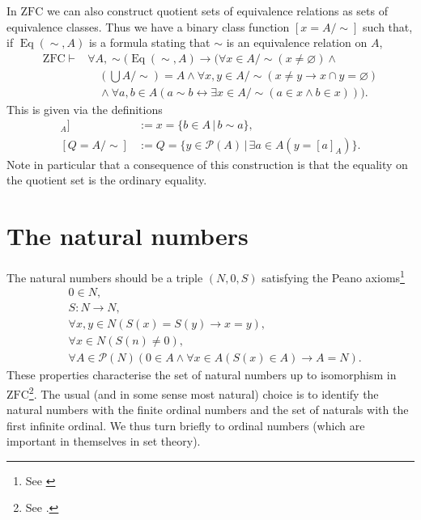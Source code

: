 \documentclass{scrartcl}
\theoremstyle{definition}
\theoremstyle{plain}
\theoremstyle{remark}
\newcommand{\ZFC}{\ensuremath{\mathrm{ZFC}}}
\newcommand{\limp}{\rightarrow}
\newcommand{\liff}{\leftrightarrow}
\newcommand{\Pow}{\mathcal{P}}
\newcommand{\sep}{\,|\,}
\newcommand{\eqdef}{:=}
\newcommand{\quot}[2]{#1/\!\!#2}
\DeclareMathOperator{\Eq}{Eq}
\begin{document}
In $\ZFC$ we can also construct quotient sets of equivalence relations as sets of equivalence classes. Thus we have a binary class function $[x = \quot{A}{\sim}]$ such that, if $\Eq(\sim,A)$ is a formula stating that $\sim$ is an equivalence relation on $A$,
\begin{align*}
  \ZFC \vdash &\forall A, \sim (\Eq(\sim,A) \limp (\forall x \in \quot{A}{\sim} (x \not= \varnothing) \land\\
              &\quad \left(\bigcup \quot{A}{\sim}\right) = A \land \forall x,y \in \quot{A}{\sim} (x \not= y \limp x \cap y = \varnothing)\\
              &\quad \land \forall a,b \in A (a \sim b \liff \exists x \in \quot{A}{\sim} (a \in x \land b \in x)))\mbox{.}
\end{align*}
This is given via the definitions
\begin{align*}
  [x = [a]_A] &\eqdef x = \{b \in A \sep b \sim a\}\text{,}\\
  [Q = \quot{A}{\sim}] &\eqdef Q = \{y \in \Pow(A) \sep \exists a \in A (y = [a]_A)\}\text{.}
\end{align*}
Note in particular that a consequence of this construction is that the equality on the quotient set is the ordinary equality.

\section{The natural numbers}
\label{sec:nat}

The natural numbers should be a triple $(N,0,S)$ satisfying the Peano axioms\footnote{See \cite{peano:1889/1967}}
\begin{align*}
  &0 \in N\mbox{,}\\
  &S : N \longrightarrow N\mbox{,}\\
  &\forall x, y \in N (S(x) = S(y) \rightarrow x = y)\mbox{,}\\
  &\forall x \in N (S(n) \not= 0)\mbox{,}\\
  &\forall A \in \Pow(N) (0 \in A \land \forall x \in A (S(x) \in A) \limp A = N)\mbox{.}
\end{align*}
These properties characterise the set of natural numbers up to isomorphism in $\ZFC$\footnote{See \cite{moschovakis:2006}.}. The usual (and in some sense most natural) choice is to identify the natural numbers with the finite ordinal numbers and the set of naturals with the first infinite ordinal. We thus turn briefly to ordinal numbers (which are important in themselves in set theory).
\end{document}
